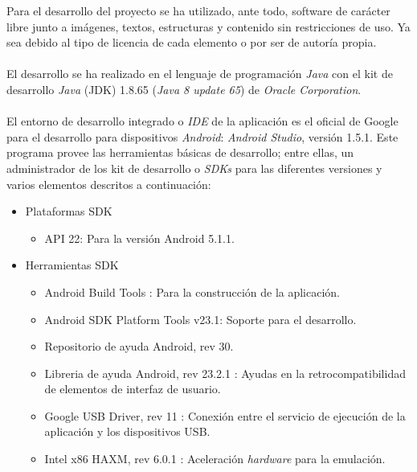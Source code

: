\documentclass[../PFC.tex]{subfiles}
\begin{document}
Para el desarrollo del proyecto se ha utilizado, ante todo, software de carácter libre junto a imágenes, textos, estructuras y contenido sin restricciones de uso. Ya sea debido al tipo de licencia de cada elemento o por ser de autoría propia.
\\\\
El desarrollo se ha realizado en el lenguaje de programación \textit{Java} con el kit de desarrollo \textit{Java} (JDK) 1.8.65 (\textit{Java 8 update 65}) de \textit{Oracle Corporation}\cite{java}.
\\\\
El entorno de desarrollo integrado o \textit{IDE} de la aplicación es el oficial de Google para el desarrollo para dispositivos \textit{Android}: \textit{Android Studio}, versión 1.5.1\cite{androidStudio}. Este programa provee las herramientas básicas de desarrollo; entre ellas, un administrador de los kit de desarrollo o \textit{SDKs} para las diferentes versiones y varios elementos descritos a continuación: 
\begin{itemize}
\item{Plataformas SDK}
	\begin{itemize}
	\item{API 22: Para la versión Android 5.1.1.}
	\end{itemize}
\item{Herramientas SDK}
	\begin{itemize}
	\item{Android Build Tools : Para la construcción de la aplicación.}
	\item{Android SDK Platform Tools v23.1: Soporte para el desarrollo.}
	\item{Repositorio de ayuda Android, rev 30.}
	\item{Libreria de ayuda Android, rev 23.2.1 : Ayudas en la retrocompatibilidad 	de elementos de interfaz de usuario.}
	\item{Google USB Driver, rev 11 : Conexión entre el servicio de ejecución de la aplicación y los dispositivos USB.}
	\item{Intel x86 HAXM, rev 6.0.1 : Aceleración \textit{hardware} para la emulación.}
	\end{itemize}
\end{itemize}
\end{document}
